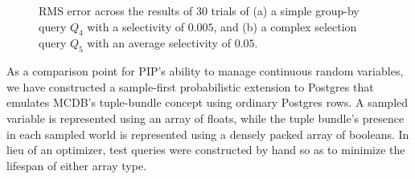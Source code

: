 \begin{figure}
\begin{center}
\vspace*{-0.1in}
\caption{RMS error across the results of 30 trials of (a) a simple group-by query $Q_4$ with a selectivity of $0.005$, and (b) a complex selection query $Q_5$ with an average selectivity of $0.05$.}
\label{fig:variance}
\end{center}
\vspace*{-0.3in}
\end{figure}

As a comparison point for PIP's ability to manage continuous random variables, we have constructed a sample-first probabilistic extension to Postgres that emulates MCDB's tuple-bundle concept using ordinary Postgres rows.  A sampled variable is represented using an array of floats, while the tuple bundle's presence in each sampled world is represented using a densely packed array of booleans.  In lieu of an optimizer, test queries were constructed by hand so as to minimize the lifespan of either array type.

